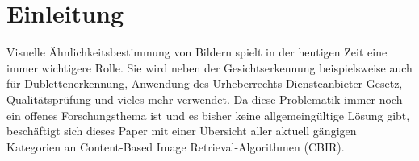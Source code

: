 \section{Einleitung}\label{einleitung}
Visuelle Ähnlichkeitsbestimmung von Bildern spielt in der heutigen Zeit eine
immer wichtigere Rolle. Sie wird neben der Gesichtserkennung beispielsweise auch
für Dublettenerkennung, Anwendung des Urheberrechts-Diensteanbieter-Gesetz,
Qualitätsprüfung und vieles mehr verwendet. Da diese Problematik immer noch ein
offenes Forschungsthema ist und es bisher keine allgemeingültige Lösung gibt,
beschäftigt sich dieses Paper mit einer Übersicht aller aktuell gängigen
Kategorien an \glqq{}Content-Based Image Retrieval\grqq{}-Algorithmen (CBIR).
